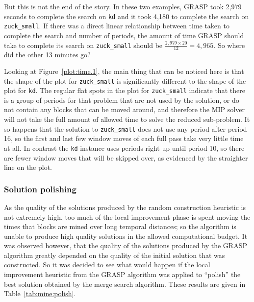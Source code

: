 \documentclass[authoryear,11pt,square,number,times,super,comma]{elsarticle}
\newcommand{\zucksmall}{\texttt{zuck\_small}}
\newcommand{\dmine}{\texttt{kd}}
\begin{document}
But this is not the end of the story. In these two examples, GRASP took 2,979 seconds to complete the search on \dmine{} and it took 4,180 to complete the search on \zucksmall{}. If there was a direct linear relationship between time taken to complete the search and number of periods, the amount of time GRASP should take to complete its search on \zucksmall{} should be \(\frac{2,979\times20}{12} = 4,965\). So where did the other 13 minutes go?

Looking at Figure~\ref{plot:time.1}, the main thing that can be noticed here is that the shape of the plot for \zucksmall{} is significantly different to the shape of the plot for \dmine{}. The regular flat spots in the plot for \zucksmall{} indicate that there is a group of periods for that problem that are not used by the solution, or do not contain any blocks that can be moved around, and therefore the MIP solver will not take the full amount of allowed time to solve the reduced sub-problem. It so happens that the solution to \zucksmall{} does not use any period after period 16, so the first and last few window moves of each full pass take very little time at all. In contrast the \dmine{} instance uses periods right up until period 10, so there are fewer window moves that will be skipped over, as evidenced by the straighter line on the plot.

\subsubsection*{Solution polishing}

As the quality of the solutions produced by the random construction heuristic is not extremely high, too much of the local improvement phase is spent moving the times that blocks are mined over long temporal distances; so the algorithm is unable to produce high quality solutions in the allowed computational budget. It was observed however, that the quality of the solutions produced by the GRASP algorithm greatly depended on the quality of the initial solution that was constructed. So it was decided to see what would happen if the local improvement heuristic from the GRASP algorithm was applied to ``polish'' the best solution obtained by the merge search algorithm. These results are given in Table~\ref{tab:mine:polish}.
\end{document}
